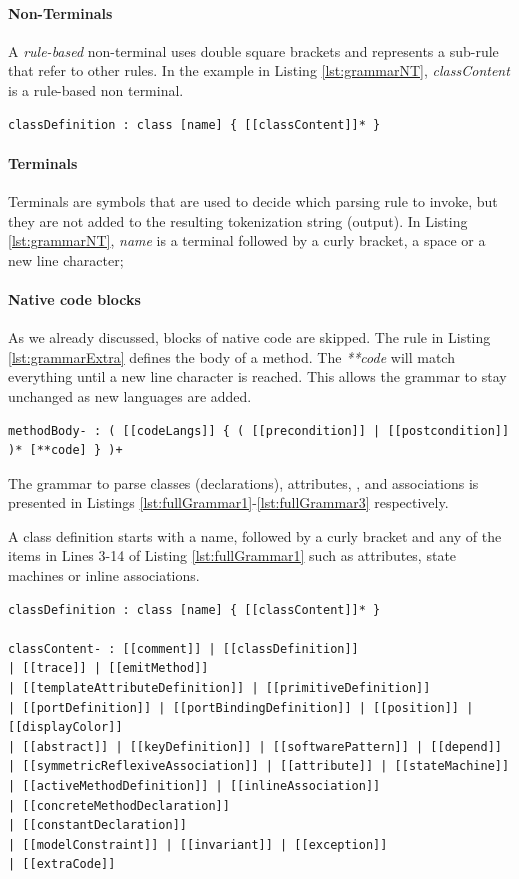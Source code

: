 \paragraph{Non-Terminals} A \textit{rule-based} non-terminal uses double square brackets and represents a sub-rule that refer to other rules. In the example in Listing \ref{lst:grammarNT}, \textit{classContent} is a rule-based non terminal. 

\begin{lstlisting}[style=umplePlain, label=lst:grammarNT,caption=Grammar for Umple classes]
 classDefinition : class [name] { [[classContent]]* }
\end{lstlisting}

\paragraph{Terminals} Terminals are symbols that are used to decide which parsing rule to invoke, but they are not added to the resulting tokenization string (output). In Listing \ref{lst:grammarNT}, \textit{name} is a terminal followed by a curly bracket, a space or a new line character; 
\paragraph{Native code blocks}
As we already discussed, blocks of native code are skipped. The rule in Listing \ref{lst:grammarExtra} defines the body of a method. The \textit{**code}  will match everything until a new line character is reached. This allows the grammar to stay unchanged as new languages are added. 

\begin{lstlisting}[style=umplePlain, label=lst:grammarExtra,caption=Grammar for Umple classes]
methodBody- : ( [[codeLangs]] { ( [[precondition]] | [[postcondition]] )* [**code] } )+
\end{lstlisting}

The grammar to parse classes (declarations), attributes, , and associations is presented in Listings \ref{lst:fullGrammar1}-\ref{lst:fullGrammar3} respectively.

A class definition starts with a name, followed by a curly bracket and any of the items in Lines 3-14 of Listing \ref{lst:fullGrammar1} such as attributes, state machines or inline associations. 

\begin{lstlisting}[style=umplePlain, label=lst:fullGrammar1,caption=Umple Grammar for classes]
classDefinition : class [name] { [[classContent]]* }

classContent- : [[comment]] | [[classDefinition]] 
| [[trace]] | [[emitMethod]] 
| [[templateAttributeDefinition]] | [[primitiveDefinition]] 
| [[portDefinition]] | [[portBindingDefinition]] | [[position]] | [[displayColor]] 
| [[abstract]] | [[keyDefinition]] | [[softwarePattern]] | [[depend]] 
| [[symmetricReflexiveAssociation]] | [[attribute]] | [[stateMachine]] 
| [[activeMethodDefinition]] | [[inlineAssociation]] 
| [[concreteMethodDeclaration]] 
| [[constantDeclaration]] 
| [[modelConstraint]] | [[invariant]] | [[exception]] 
| [[extraCode]]
\end{lstlisting}


